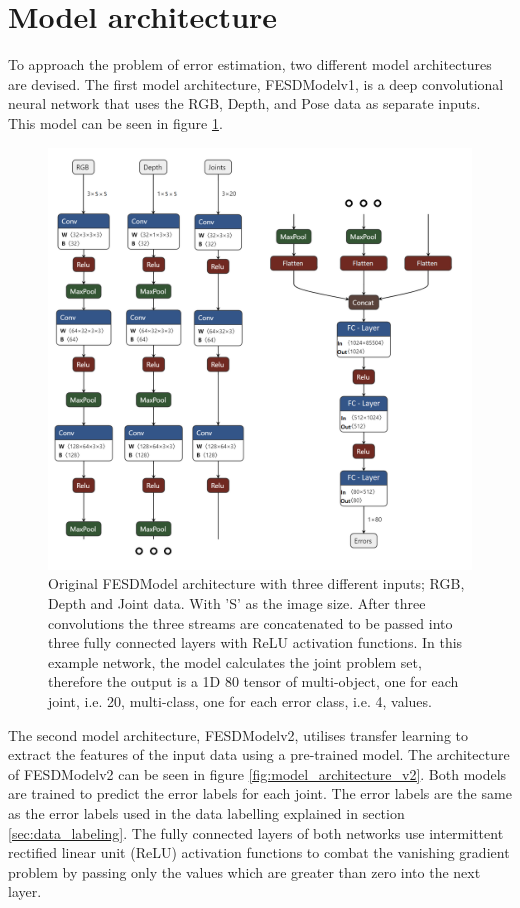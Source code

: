 \section{Model architecture}
\label{sec:model_architecture}

To approach the problem of error estimation, two different model architectures are devised. The first model architecture, FESDModelv1, is a deep convolutional neural network that uses the RGB, Depth, and Pose data as separate inputs. This model can be seen in figure \ref{fig:model_architecture_v1}.

\begin{figure}[htbp]
  \centering
  \includegraphics[width=.8\linewidth]{figures/Model/FESD.png}
  \caption[FESDModel architecture version 1]{Original FESDModel architecture with three different inputs; RGB, Depth and Joint data. With 'S' as the image size. After three convolutions the three streams are concatenated to be passed into three fully connected layers with ReLU activation functions. In this example network, the model calculates the joint problem set, therefore the output is a 1D 80 tensor of multi-object, one for each joint, i.e. 20, multi-class, one for each error class, i.e. 4, values.}
  \label{fig:model_architecture_v1}
\end{figure}

The second model architecture, FESDModelv2, utilises transfer learning to extract the features of the input data using a pre-trained model. The architecture of FESDModelv2 can be seen in figure \ref{fig:model_architecture_v2}. Both models are trained to predict the error labels for each joint. The error labels are the same as the error labels used in the data labelling explained in section \ref{sec:data_labeling}. The fully connected layers of both networks use intermittent rectified linear unit (ReLU) activation functions to combat the vanishing gradient problem by passing only the values which are greater than zero into the next layer.

